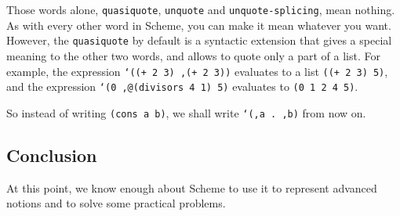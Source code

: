 Those words alone, \texttt{quasiquote}, \texttt{unquote} and
\texttt{unquote-splicing}, mean nothing. As with every other word
in Scheme, you can make it mean whatever you want. However,
the \texttt{quasiquote} by default is a syntactic extension
that gives a special meaning to the other two words, and allows
to quote only a part of a list. For example, the expression
\texttt{`((+ 2 3) ,(+ 2 3))} evaluates to a list \texttt{((+ 2 3) 5)}, 
and the expression  \texttt{`(0 ,@(divisors 4 1) 5)} evaluates
to \texttt{(0 1 2 4 5)}.

So instead of writing \texttt{(cons a b)}, we shall write
\texttt{`(,a . ,b)} from now on.

\subsection{Conclusion}

At this point, we know enough about Scheme to use it to represent
advanced notions and to solve some practical problems.
